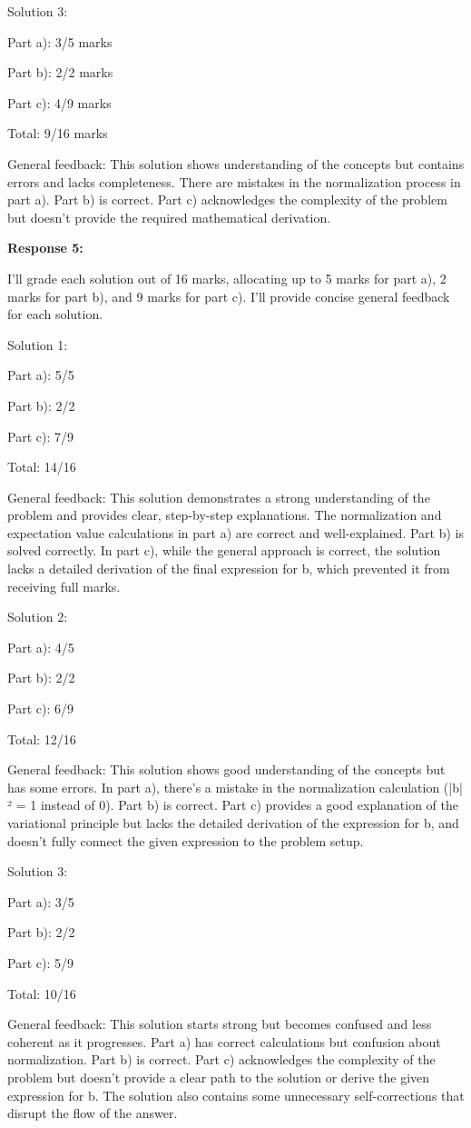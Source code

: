 \documentclass[a4paper,11pt]{article}
\begin{document}
Solution 3:

Part a): 3/5 marks

Part b): 2/2 marks

Part c): 4/9 marks

Total: 9/16 marks

General feedback: This solution shows understanding of the concepts but contains errors and lacks completeness. There are mistakes in the normalization process in part a). Part b) is correct. Part c) acknowledges the complexity of the problem but doesn't provide the required mathematical derivation.

\bigskip   
\textbf{Response 5:}

I'll grade each solution out of 16 marks, allocating up to 5 marks for part a), 2 marks for part b), and 9 marks for part c). I'll provide concise general feedback for each solution.

Solution 1:

Part a): 5/5

Part b): 2/2

Part c): 7/9

Total: 14/16

General feedback: This solution demonstrates a strong understanding of the problem and provides clear, step-by-step explanations. The normalization and expectation value calculations in part a) are correct and well-explained. Part b) is solved correctly. In part c), while the general approach is correct, the solution lacks a detailed derivation of the final expression for b, which prevented it from receiving full marks.

Solution 2:

Part a): 4/5

Part b): 2/2

Part c): 6/9

Total: 12/16

General feedback: This solution shows good understanding of the concepts but has some errors. In part a), there's a mistake in the normalization calculation (|b|² = 1 instead of 0). Part b) is correct. Part c) provides a good explanation of the variational principle but lacks the detailed derivation of the expression for b, and doesn't fully connect the given expression to the problem setup.

Solution 3:

Part a): 3/5

Part b): 2/2

Part c): 5/9

Total: 10/16

General feedback: This solution starts strong but becomes confused and less coherent as it progresses. Part a) has correct calculations but confusion about normalization. Part b) is correct. Part c) acknowledges the complexity of the problem but doesn't provide a clear path to the solution or derive the given expression for b. The solution also contains some unnecessary self-corrections that disrupt the flow of the answer.
\end{document}

